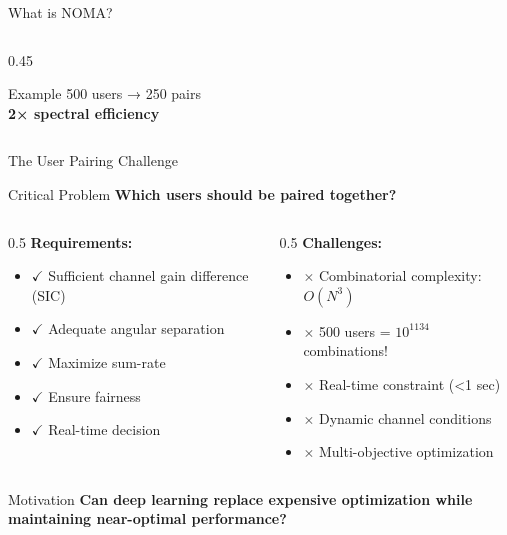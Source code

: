 \documentclass[aspectratio=169]{beamer}
\begin{document}
\begin{frame}{What is NOMA?}
\begin{columns}
\begin{column}{0.45\textwidth}
            \vspace{0.3cm}
            \begin{exampleblock}{Example}
                500 users → 250 pairs\\
                \textbf{2× spectral efficiency}
            \end{exampleblock}
        \end{column}
    \end{columns}
\end{frame}

\begin{frame}{The User Pairing Challenge}
    \begin{block}{Critical Problem}
        \textbf{Which users should be paired together?}
    \end{block}
    
    \vspace{0.3cm}
    
    \begin{columns}
        \begin{column}{0.5\textwidth}
            \textbf{Requirements:}
            \begin{itemize}
                \item $\checkmark$ Sufficient channel gain difference (SIC)
                \item $\checkmark$ Adequate angular separation
                \item $\checkmark$ Maximize sum-rate
                \item $\checkmark$ Ensure fairness
                \item $\checkmark$ Real-time decision
            \end{itemize}
        \end{column}
        \begin{column}{0.5\textwidth}
            \textbf{Challenges:}
            \begin{itemize}
                \item $\times$ Combinatorial complexity: $O(N^3)$
                \item $\times$ 500 users = $10^{1134}$ combinations!
                \item $\times$ Real-time constraint (<1 sec)
                \item $\times$ Dynamic channel conditions
                \item $\times$ Multi-objective optimization
            \end{itemize}
        \end{column}
    \end{columns}
    
    \vspace{0.3cm}
    
    \begin{alertblock}{Motivation}
        \textbf{Can deep learning replace expensive optimization while maintaining near-optimal performance?}
    \end{alertblock}
\end{frame}
\end{document}
